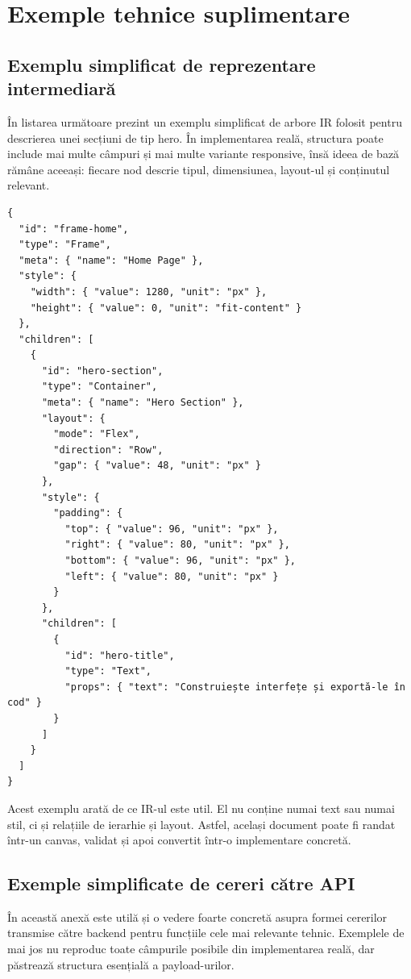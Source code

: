\chapter{Exemple tehnice suplimentare}

\section{Exemplu simplificat de reprezentare intermediară}

În listarea următoare prezint un exemplu simplificat de arbore IR folosit pentru descrierea unei secțiuni de tip hero. În implementarea reală, structura poate include mai multe câmpuri și mai multe variante responsive, însă ideea de bază rămâne aceeași: fiecare nod descrie tipul, dimensiunea, layout-ul și conținutul relevant.

\begin{lstlisting}[style=favigon,caption={Exemplu simplificat de IR pentru o secțiune hero}]
{
  "id": "frame-home",
  "type": "Frame",
  "meta": { "name": "Home Page" },
  "style": {
    "width": { "value": 1280, "unit": "px" },
    "height": { "value": 0, "unit": "fit-content" }
  },
  "children": [
    {
      "id": "hero-section",
      "type": "Container",
      "meta": { "name": "Hero Section" },
      "layout": {
        "mode": "Flex",
        "direction": "Row",
        "gap": { "value": 48, "unit": "px" }
      },
      "style": {
        "padding": {
          "top": { "value": 96, "unit": "px" },
          "right": { "value": 80, "unit": "px" },
          "bottom": { "value": 96, "unit": "px" },
          "left": { "value": 80, "unit": "px" }
        }
      },
      "children": [
        {
          "id": "hero-title",
          "type": "Text",
          "props": { "text": "Construiește interfețe și exportă-le în cod" }
        }
      ]
    }
  ]
}
\end{lstlisting}

Acest exemplu arată de ce IR-ul este util. El nu conține numai text sau numai stil, ci și relațiile de ierarhie și layout. Astfel, același document poate fi randat într-un canvas, validat și apoi convertit într-o implementare concretă.

\section{Exemple simplificate de cereri către API}

În această anexă este utilă și o vedere foarte concretă asupra formei cererilor transmise către backend pentru funcțiile cele mai relevante tehnic. Exemplele de mai jos nu reproduc toate câmpurile posibile din implementarea reală, dar păstrează structura esențială a payload-urilor.

